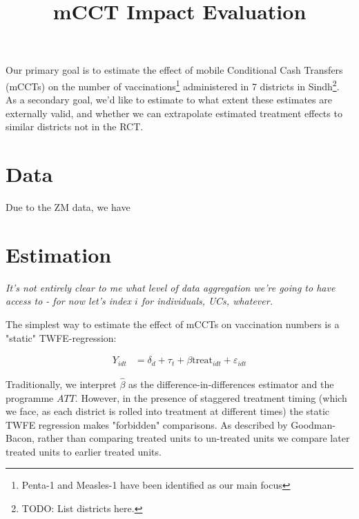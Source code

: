 \documentclass{article}
\title{mCCT Impact Evaluation}
\begin{document}
\maketitle


Our primary goal is to estimate the effect of mobile Conditional Cash Transfers (mCCTs)
on the number of vaccinations\footnote{Penta-1 and Measles-1 have been identified as 
our main focus} administered in 7 districts in Sindh\footnote{TODO: List 
districts here.}. As a secondary goal, we'd like to estimate to what extent these 
estimates are externally valid, and whether we can extrapolate estimated treatment 
effects to similar districts not in the RCT. 


\section{Data}
Due to the ZM data, we have 



\section{Estimation}


\textit{It's not entirely clear to me what level of data aggregation we're going to have 
access to - for now let's index $i$ for individuals, UCs, whatever.}



The simplest way to estimate the effect of mCCTs on vaccination numbers is a 
"static" TWFE-regression:


\begin{align*}
   Y_{idt} &= \delta_d + \tau_t + \beta \text{treat}_{idt} + \varepsilon_{idt} 
\end{align*}

Traditionally, we interpret $\hat{\beta}$ as the difference-in-differences estimator 
and the programme $ATT$. However, in the presence of staggered treatment timing 
(which we face, as each district is rolled into treatment at different times) the 
static TWFE regression makes "forbidden" comparisons. As described by Goodman-Bacon, rather than comparing treated 
units to un-treated units we compare later treated units to earlier treated units.
\end{document}
